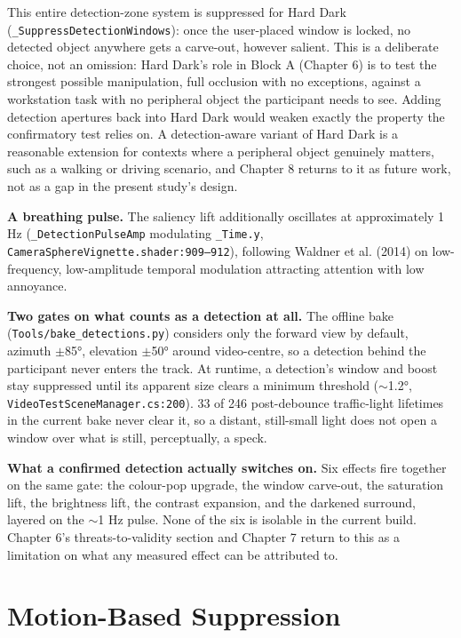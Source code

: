 This entire detection-zone system is suppressed for Hard Dark (\verb|_SuppressDetectionWindows|):
once the user-placed window is locked, no detected object anywhere gets a carve-out, however
salient. This is a deliberate choice, not an omission: Hard Dark's role in Block A (Chapter 6) is to
test the strongest possible manipulation, full occlusion with no exceptions, against a workstation
task with no peripheral object the participant needs to see. Adding detection apertures back into
Hard Dark would weaken exactly the property the confirmatory test relies on. A detection-aware
variant of Hard Dark is a reasonable extension for contexts where a peripheral object genuinely
matters, such as a walking or driving scenario, and Chapter 8 returns to it as future work, not as a
gap in the present study's design.

\textbf{A breathing pulse.} The saliency lift additionally oscillates at approximately 1 Hz
(\verb|_DetectionPulseAmp| modulating \verb|_Time.y|, \verb|CameraSphereVignette.shader:909–912|),
following Waldner et al. (2014) on low-frequency, low-amplitude temporal modulation
attracting attention with low annoyance.

\textbf{Two gates on what counts as a detection at all.} The offline bake
(\verb|Tools/bake_detections.py|) considers only the forward view by default, azimuth $\pm$85°,
elevation $\pm$50° around video-centre, so a detection behind the participant never enters the
track. At runtime, a detection's window and boost stay suppressed until its apparent size clears a
minimum threshold ($\sim$1.2°, \verb|VideoTestSceneManager.cs:200|). 33 of 246 post-debounce
traffic-light lifetimes in the current bake never clear it, so a distant, still-small light does not
open a window over what is still, perceptually, a speck.

\textbf{What a confirmed detection actually switches on.} Six effects fire together on the same
gate: the colour-pop upgrade, the window carve-out, the saturation lift, the brightness lift, the
contrast expansion, and the darkened surround, layered on the $\sim$1 Hz pulse. None of the six is
isolable in the current build. Chapter 6's threats-to-validity section and Chapter 7 return to this
as a limitation on what any measured effect can be attributed to.

\section{Motion-Based Suppression}

